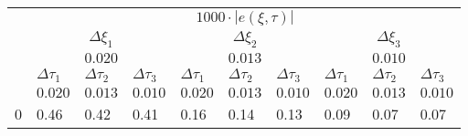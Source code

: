\begin{tabular}{llllllllll}
\toprule
{} & \multicolumn{9}{c}{$1000\cdot|e(ξ,\tau)|$} \\
{} & \multicolumn{3}{c}{$\Delta ξ_1$} & \multicolumn{3}{c}{$\Delta ξ_2$} & \multicolumn{3}{c}{$\Delta ξ_3$} \\
{} & \multicolumn{3}{c}{$0.020$} & \multicolumn{3}{c}{$0.013$} & \multicolumn{3}{c}{$0.010$} \\
{} &        $\Delta \tau_1$ & $\Delta \tau_2$ & $\Delta \tau_3$ & $\Delta \tau_1$ & $\Delta \tau_2$ & $\Delta \tau_3$ & $\Delta \tau_1$ & $\Delta \tau_2$ & $\Delta \tau_3$ \\
{} &                $0.020$ &         $0.013$ &         $0.010$ &         $0.020$ &         $0.013$ &         $0.010$ &         $0.020$ &         $0.013$ &         $0.010$ \\
\midrule
0 &                   0.46 &            0.42 &            0.41 &            0.16 &            0.14 &            0.13 &            0.09 &            0.07 &            0.07 \\
\bottomrule
\end{tabular}
